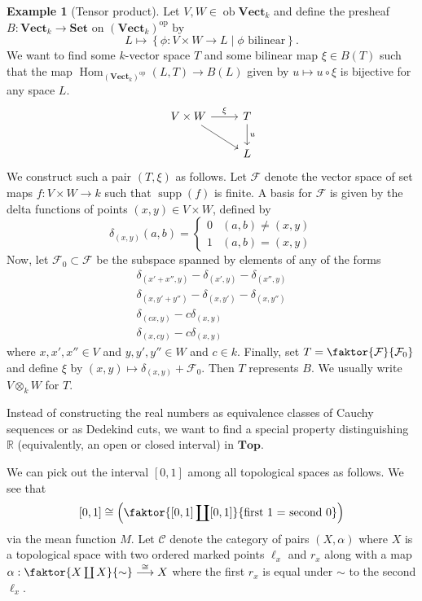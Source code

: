 \documentclass[10pt,letterpaper,cm]{nupset}
\theoremstyle{definition}
\newtheorem{exmp}[definition]{Example}
\theoremstyle{theorem}
\theoremstyle{remark}
\newcommand{\R}{\mathbb R}
\newcommand{\1}{\mathbf{1}}
\renewcommand{\c}{\mathscr{C}}
\newcommand{\0}{\vec 0}
\DeclareMathOperator{\op}{op}
\DeclareMathOperator{\ob}{ob}
\DeclareMathOperator{\Hom}{Hom}
\DeclareMathOperator{\supp}{supp}
\begin{document}
\begin{exmp}[Tensor product]
Let $V, W \in \ob \mathbf{Vect}_k$ and define the presheaf $B: \mathbf{Vect}_k \to \mathbf{Set}$ on $\left( \mathbf{Vect}_k\right)^{\op}$ by $$L \mapsto \left\{ \phi : V \times W \to L \mid \phi \text{ bilinear}\right\}.$$ We want to find some $k$-vector space $T$ and some bilinear map $\xi \in B(T)$ such that the map $\Hom_{\left( \mathbf{Vect}_k\right)^{\op}}(L, T) \to B(L)$ given by $u \mapsto u \circ \xi$ is bijective for any space $L$. 
\[
\begin{tikzcd}
V \times W \arrow[r, "\xi"] \arrow[rd] & T \arrow[d, "u"] \\
 & L
\end{tikzcd}
\]
We construct such a pair $(T, \xi)$ as follows. Let $\mathcal{F}$ denote the vector space of set maps $f: V \times W \to k$ such that $\supp(f)$ is finite. A basis for $\mathcal{F}$ is given by the delta functions of points $(x, y) \in V \times W$, defined by
\[ \delta_{(x,y)}(a, b) = \begin{cases}
0 & (a,b) \ne (x,y) \\
1 & (a, b) = (x,y)
\end{cases}
\]
Now, let $\mathcal{F}_0 \subset \mathcal{F}$ be the subspace spanned by elements of any of the forms
\begin{gather*}
 \delta_{(x' + x'', y)} - \delta_{(x', y)} - \delta_{(x'', y)} 
 \\ \delta_{(x, y' + y'')} - \delta_{(x, y')} - \delta_{(x, y'')} 
\\ \delta_{(cx, y)} - c\delta_{(x,y)}  
\\\delta_{(x,cy)} -c \delta_{(x,y)} 
\end{gather*}
where $x, x', x'' \in V$ and $y, y', y'' \in W$ and $c \in k$. Finally, set $T = \faktor{\mathcal{F}}{\mathcal{F}_0}$ and define $\xi$ by  $(x, y) \mapsto \delta_{(x,y)} + \mathcal{F}_0$. Then $T$ represents $B$. We usually write $V \otimes_k W$ for $T$.
\end{exmp}

\bigskip

 Instead of constructing the real numbers as equivalence classes of Cauchy sequences or as Dedekind cuts, we want to find a special property distinguishing $\R$ (equivalently, an open or closed interval) in  $\mathbf{Top}$. 

We can pick out the interval $[0,1]$ among all topological spaces as follows. We see that $$[0,1]\cong \left( \faktor{[0,1] \coprod [0,1]}{\text{first 1 = second 0}} \right)$$ via the mean function $M$. Let $\c$ denote the category of pairs $(X, \alpha)$ where $X$ is a topological space with two ordered marked points $\ell_x$ and $r_x$  along with a map $\alpha :  \faktor{X \coprod X}{\sim} \overset{\cong}{\longrightarrow} X$ where the first $r_x$ is equal under $\sim$ to the second $\ell_x$.
 
\end{document}
